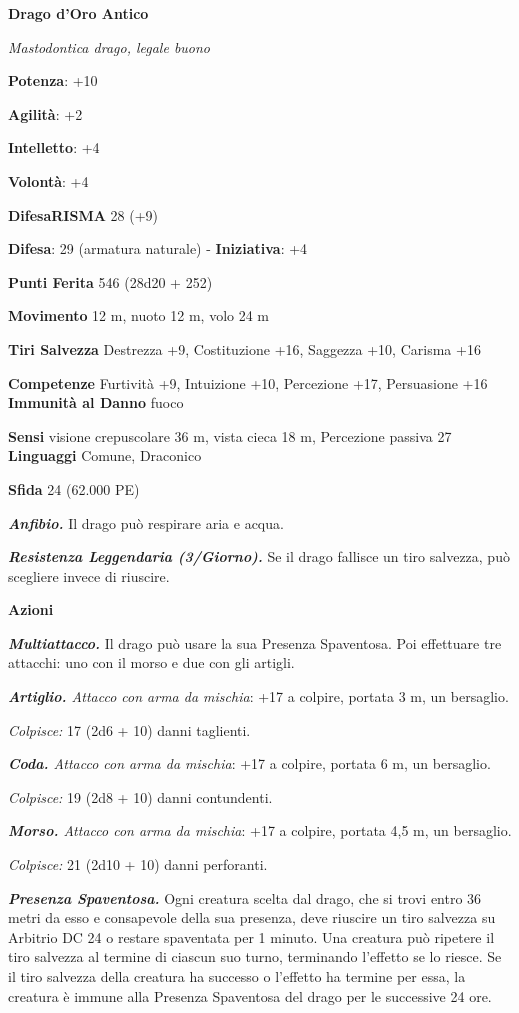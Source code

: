 \begin{multicols}{2}
\textbf{Drago d'Oro Antico}

\emph{Mastodontica drago, legale buono}

\textbf{Potenza}: +10

\textbf{Agilità}: +2

\textbf{Intelletto}: +4

\textbf{Volontà}: +4

\textbf{DifesaRISMA} 28 (+9)

\textbf{Difesa}: 29 (armatura naturale) - \textbf{Iniziativa}: +4

\textbf{Punti Ferita} 546 (28d20 + 252) 

\textbf{Movimento} 12 m, nuoto 12 m, volo 24 m

\textbf{Tiri Salvezza} Destrezza +9, Costituzione +16, Saggezza +10,
Carisma +16

\textbf{Competenze} Furtività +9, Intuizione +10, Percezione +17,
Persuasione +16 \textbf{Immunità al Danno} fuoco

\textbf{Sensi} visione crepuscolare 36 m, vista cieca 18 m, Percezione passiva
27 \textbf{Linguaggi} Comune, Draconico

\textbf{Sfida} 24 (62.000 PE)

\emph{\textbf{Anfibio.}} Il drago può respirare aria e acqua.

\emph{\textbf{Resistenza Leggendaria (3/Giorno).}} Se il drago fallisce
un tiro salvezza, può scegliere invece di riuscire.

\textbf{Azioni}

\emph{\textbf{Multiattacco.}} Il drago può usare la sua Presenza
Spaventosa. Poi effettuare tre attacchi: uno con il morso e due con gli
artigli.

\emph{\textbf{Artiglio.} Attacco con arma da mischia}: +17 a colpire,
portata 3 m, un bersaglio.

\emph{Colpisce:} 17 (2d6 + 10) danni taglienti.

\emph{\textbf{Coda.} Attacco con arma da mischia}: +17 a colpire,
portata 6 m, un bersaglio.

\emph{Colpisce:} 19 (2d8 + 10) danni contundenti.

\emph{\textbf{Morso.} Attacco con arma da mischia}: +17 a colpire,
portata 4,5 m, un bersaglio.

\emph{Colpisce:} 21 (2d10 + 10) danni perforanti.

\emph{\textbf{Presenza Spaventosa.}} Ogni creatura scelta dal drago, che
si trovi entro 36 metri da esso e consapevole della sua presenza, deve
riuscire un tiro salvezza su Arbitrio DC 24 o restare spaventata per 1
minuto. Una creatura può ripetere il tiro salvezza al termine di ciascun
suo turno, terminando l'effetto se lo riesce. Se il tiro salvezza della
creatura ha successo o l'effetto ha termine per essa, la creatura è
immune alla Presenza Spaventosa del drago per le successive 24 ore.


\end{multicols}
